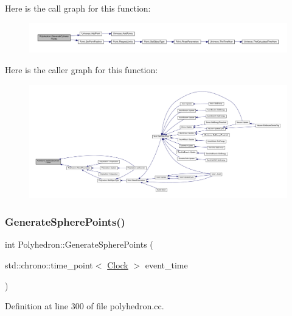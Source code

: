 Here is the call graph for this function\+:
\nopagebreak
\begin{figure}[H]
\begin{center}
\leavevmode
\includegraphics[width=350pt]{class_polyhedron_a642a64ae8cde5e2a9f15334e151fd3f9_cgraph}
\end{center}
\end{figure}
Here is the caller graph for this function\+:
\nopagebreak
\begin{figure}[H]
\begin{center}
\leavevmode
\includegraphics[width=350pt]{class_polyhedron_a642a64ae8cde5e2a9f15334e151fd3f9_icgraph}
\end{center}
\end{figure}
\mbox{\label{class_polyhedron_a15d1cae35ceb6c1ba559928fd417800c}} 
\subsubsection{\texorpdfstring{Generate\+Sphere\+Points()}{GenerateSpherePoints()}}
{\footnotesize\ttfamily int Polyhedron\+::\+Generate\+Sphere\+Points (\begin{DoxyParamCaption}\item[{std\+::chrono\+::time\+\_\+point$<$ \hyperlink{universe_8h_a0ef8d951d1ca5ab3cfaf7ab4c7a6fd80}{Clock} $>$}]{event\+\_\+time }\end{DoxyParamCaption})}



Definition at line 300 of file polyhedron.\+cc.

